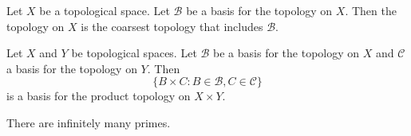 \begin{prop}
Let $X$ be a topological space.
Let $\mathcal{B}$ be a basis for the topology on $X$.
Then the topology on $X$ is the coarsest topology that includes $\mathcal{B}$.
\end{prop}

\begin{prop}
Let $X$ and $Y$ be topological spaces. Let $\mathcal{B}$ be a basis for the topology on $X$ and $\mathcal{C}$ a basis for the topology on $Y$. Then
\[ \{ B \times C : B \in \mathcal{B}, C \in \mathcal{C} \} \]
is a basis for the product topology on $X \times Y$.
\end{prop}

\begin{thm}
There are infinitely many primes.
\end{thm}

